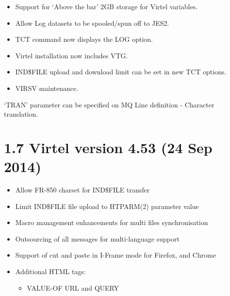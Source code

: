 \documentclass[letterpaper,10pt,english]{sphinxmanual}
\begin{document}
\begin{itemize}
\item {} 
Support for ‘Above the bar’ 2GB storage for Virtel variables.

\item {} 
Allow Log datasets to be spooled/spun off to JES2.

\item {} 
TCT command now displays the LOG option.

\item {} 
Virtel installation now includes VTG.

\item {} 
IND\$FILE upload and download limit can be set in new TCT options.

\item {} 
VIRSV maintenance.

\end{itemize}


‘TRAN’ parameter can be specified on MQ Line definition - Character translation.


\section{1.7 Virtel version 4.53 (24 Sep 2014)}
\label{\detokenize{Installation_Guide:virtel-version-4-53-24-sep-2014}}
\begin{itemize}
\item {} 
Allow FR-850 charset for IND\$FILE transfer

\item {} 
Limit IND\$FILE file upload to HTPARM(2) parameter value

\item {} 
Macro management enhancements for multi files synchronisation

\item {} 
Outsourcing of all messages for multi-language support

\item {} 
Support of cut and paste in I-Frame mode for Firefox, and Chrome

\item {} 
Additional HTML tags:
\begin{itemize}
\item {} 
VALUE-OF URL and QUERY

\end{itemize}

\end{itemize}
\end{document}
